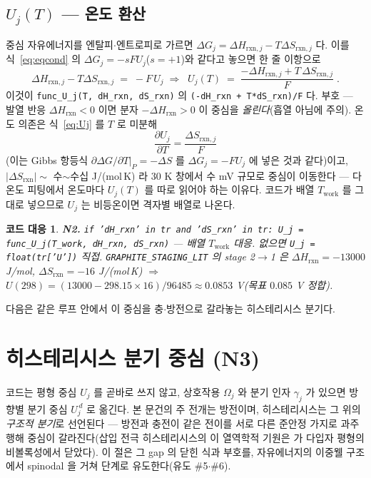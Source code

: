 \documentclass[11pt,a4paper]{article}
\newtheorem*{codebox}{코드 대응}
\newcommand{\rxn}{\mathrm{rxn}}
\newcommand{\work}{\mathrm{work}}
\newcommand{\code}[1]{\texttt{#1}}
\begin{document}
\subsection{$U_j(T)$ — 온도 환산}
중심 자유에너지를 엔탈피$\cdot$엔트로피로 가르면 $\Delta G_j=\Delta H_{\rxn,j}-T\Delta S_{\rxn,j}$ 다. 이를
식~\eqref{eq:eqcond} 의 $\Delta G_j=-sFU_j$($s=+1$)와 같다고 놓으면 한 줄 이항으로
\begin{equation}
\Delta H_{\rxn,j}-T\Delta S_{\rxn,j}\;=\;-F\,U_j
\;\Longrightarrow\;
\boxed{\;U_j(T)\;=\;\frac{-\Delta H_{\rxn,j}+T\,\Delta S_{\rxn,j}}{F}\;.}
\label{eq:Uj}
\end{equation}
이것이 \code{func\_U\_j(T, dH\_rxn, dS\_rxn)} 의 \code{(-dH\_rxn + T*dS\_rxn)/F} 다. 부호 --- 발열 반응
$\Delta H_\rxn<0$ 이면 분자 $-\Delta H_\rxn>0$ 이 중심을 \emph{올린다}(흡열 아님에 주의). 온도 의존은 식~\eqref{eq:Uj}
를 $T$ 로 미분해
\begin{equation}
\frac{\partial U_j}{\partial T}=\frac{\Delta S_{\rxn,j}}{F}
\label{eq:dUdT}
\end{equation}
(이는 Gibbs 항등식 $\partial\Delta G/\partial T|_P=-\Delta S$ 를 $\Delta G_j=-FU_j$ 에 넣은 것과 같다)이고,
$|\Delta S_\rxn|\sim$ 수$\sim$수십 J/(mol\,K) 라 $30$ K 창에서 수 mV 규모로 중심이 이동한다 --- 다온도 피팅에서 온도마다
$U_j(T)$ 를 따로 읽어야 하는 이유다. 코드가 배열 $T_\work$ 를 그대로 넣으므로 $U_j$ 는 비등온이면 격자별 배열로 나온다.

\begin{codebox}
\textbf{N2.} \code{if 'dH\_rxn' in tr and 'dS\_rxn' in tr: U\_j = func\_U\_j(T\_work, dH\_rxn, dS\_rxn)}
--- 배열 $T_\work$ 대응. 없으면 \code{U\_j = float(tr['U'])} 직접. \code{GRAPHITE\_STAGING\_LIT} 의 stage 2$\to$1 은
$\Delta H_\rxn=-13000$ J/mol, $\Delta S_\rxn=-16$ J/(mol\,K) $\Rightarrow$ $U(298)=(13000-298.15\times16)/96485
\approx0.0853$ V(목표 $0.085$ V 정합).
\end{codebox}

다음은 같은 루프 안에서 이 중심을 충$\cdot$방전으로 갈라놓는 히스테리시스 분기다.

\section{히스테리시스 분기 중심 (N3)}\label{sec:hys}
코드는 평형 중심 $U_j$ 를 곧바로 쓰지 않고, 상호작용 $\Omega_j$ 와 분기 인자 $\gamma_j$ 가 있으면 방향별 분기 중심
$U_j^{\,d}$ 로 옮긴다. 본 문건의 주 전개는 방전이며, 히스테리시스는 그 위의 \emph{구조적 분기}로 선언된다 --- 방전과 충전이
같은 전이를 서로 다른 준안정 가지로 과주행해 중심이 갈라진다(삽입 전극 히스테리시스의 이 열역학적 기원은
\cite{dreyer2010} 가 다입자 평형의 비볼록성에서 닫았다). 이 절은 그 gap 의 닫힌 식과 부호를, 자유에너지의 이중웰
구조에서 spinodal 을 거쳐 단계로 유도한다(유도 \#5$\cdot$\#6).
\end{document}
